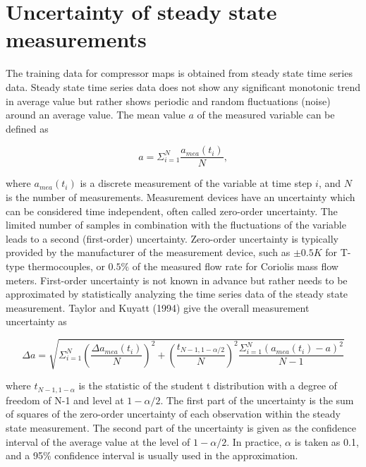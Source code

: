 \section{Uncertainty of steady state measurements}
\label{sec:unc_steady}
The training data for compressor maps is obtained from steady state time series data. Steady state time series data does not show any significant monotonic trend in average value but rather shows periodic and random fluctuations (noise) around an average value. The mean value $a$ of the measured variable can be defined as

\begin{equation}
a = \Sigma _{i = 1}^N{\frac{{{a_{mea}}({t_i})}}{N}},
\label{eq:avg_mea}
\end{equation}

where $a_{mea}(t_i)$ is a discrete measurement of the variable at time step $i$, and $N$ is the number of measurements. Measurement devices have an uncertainty which can be considered time independent, often called zero-order uncertainty. The limited number of samples in combination with the fluctuations of the variable leads to a second (first-order) uncertainty.  Zero-order uncertainty is typically provided by the manufacturer of the measurement device, such as $\pm0.5K$ for T-type thermocouples, or $0.5\%$ of the measured flow rate for Coriolis mass flow meters. First-order uncertainty is not known in advance but rather needs to be approximated by statistically analyzing the time series data of the steady state measurement. Taylor and Kuyatt (1994)\cite{Kamei:1995} give the overall measurement uncertainty as

\begin{equation}
\Delta a = \sqrt {\Sigma _{i = 1}^N{{\left(\frac{{\Delta {a_{mea}}({t_i})}}{N}\right)}^2} + {{\left(\frac{{{t_{N - 1,1 - \alpha /2}}}}{N}\right)}^2}\frac{{\Sigma _{i = 1}^N{{\left({a_{mea}}({t_i}) - a\right)}^2}}}{{N - 1}}} 
\label{eq:mea_unc_TK}
\end{equation}

where $t_{N-1,1-\alpha}$ is the statistic of the student t distribution with a degree of freedom of N-1 and level at $1-\alpha/2$. The first part of the uncertainty is the sum of squares of the zero-order uncertainty of each observation within the steady state measurement. The second part of the uncertainty is given as the confidence interval of the average value at the level of $1-\alpha/2$. In practice, $\alpha$ is taken as 0.1, and a 95\% confidence interval is usually used in the approximation.